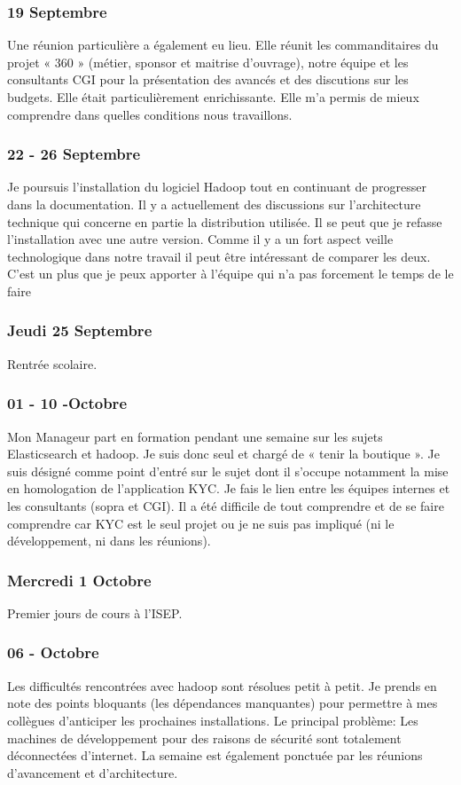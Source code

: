 \subsubsection*{19 Septembre}
Une réunion particulière a également eu lieu. Elle réunit les commanditaires du projet « 360 » (métier, sponsor et maitrise d’ouvrage), notre équipe et les consultants CGI pour la présentation des avancés et des discutions sur les budgets. Elle était particulièrement enrichissante. Elle m’a permis de mieux comprendre dans quelles conditions nous travaillons.
\subsubsection*{22 - 26 Septembre}
Je poursuis l’installation du logiciel Hadoop tout en continuant de progresser dans la documentation. Il y a actuellement des discussions sur l’architecture technique qui concerne en partie la distribution utilisée. Il se peut que je refasse  l’installation avec une autre version. Comme il y a un fort aspect veille technologique dans notre travail il peut être intéressant de comparer les deux. C’est un plus que je peux apporter à l’équipe qui n’a pas forcement le temps de le faire     
\subsubsection*{Jeudi 25 Septembre}
Rentrée scolaire.
\subsubsection*{01 - 10 -Octobre}
Mon Manageur part en formation pendant une semaine sur les sujets Elasticsearch et hadoop. Je suis donc seul et chargé de « tenir la boutique ». Je suis désigné comme point d’entré sur le sujet dont il s’occupe notamment la mise en homologation de l’application KYC. Je fais le lien entre les équipes internes et  les consultants (sopra et CGI). Il a été difficile de tout comprendre et de se faire comprendre car KYC est le seul projet ou je ne suis pas impliqué (ni le développement, ni dans les réunions).
\subsubsection*{Mercredi 1 Octobre}
Premier jours de cours à l’ISEP.
\subsubsection*{06 - Octobre}
Les difficultés rencontrées avec hadoop sont résolues petit à petit. Je prends en note des points bloquants (les dépendances  manquantes) pour permettre à mes collègues d’anticiper les prochaines installations. Le principal problème: Les machines de développement pour des raisons de sécurité sont totalement déconnectées d’internet. La semaine est également ponctuée par les réunions d’avancement et d’architecture.
